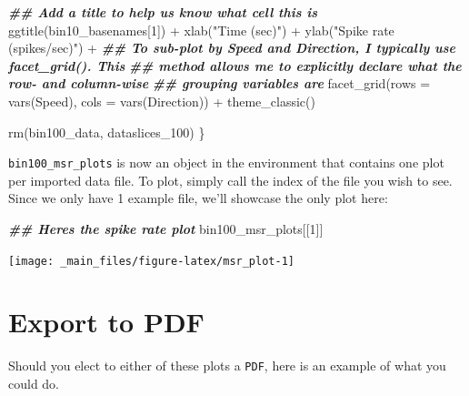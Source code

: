 \documentclass[
]{book}
\newenvironment{Shaded}{\begin{snugshade}}{\end{snugshade}}
\newcommand{\AttributeTok}[1]{\textcolor[rgb]{0.77,0.63,0.00}{#1}}
\newcommand{\DecValTok}[1]{\textcolor[rgb]{0.00,0.00,0.81}{#1}}
\newcommand{\DocumentationTok}[1]{\textcolor[rgb]{0.56,0.35,0.01}{\textbf{\textit{#1}}}}
\newcommand{\FunctionTok}[1]{\textcolor[rgb]{0.00,0.00,0.00}{#1}}
\newcommand{\NormalTok}[1]{#1}
\newcommand{\SpecialCharTok}[1]{\textcolor[rgb]{0.00,0.00,0.00}{#1}}
\newcommand{\StringTok}[1]{\textcolor[rgb]{0.31,0.60,0.02}{#1}}
\begin{document}
\begin{Shaded}
\begin{Highlighting}[]
    \DocumentationTok{\#\# Add a title to help us know what cell this is}
    \FunctionTok{ggtitle}\NormalTok{(bin10\_basenames[}\DecValTok{1}\NormalTok{]) }\SpecialCharTok{+}
    \FunctionTok{xlab}\NormalTok{(}\StringTok{"Time (sec)"}\NormalTok{) }\SpecialCharTok{+}
    \FunctionTok{ylab}\NormalTok{(}\StringTok{"Spike rate (spikes/sec)"}\NormalTok{) }\SpecialCharTok{+}
    \DocumentationTok{\#\# To sub{-}plot by Speed and Direction, I typically use \textasciigrave{}facet\_grid()\textasciigrave{}. This}
    \DocumentationTok{\#\# method allows me to explicitly declare what the row{-} and column{-}wise}
    \DocumentationTok{\#\# grouping variables are}
    \FunctionTok{facet\_grid}\NormalTok{(}\AttributeTok{rows =} \FunctionTok{vars}\NormalTok{(Speed), }\AttributeTok{cols =} \FunctionTok{vars}\NormalTok{(Direction)) }\SpecialCharTok{+}
    \FunctionTok{theme\_classic}\NormalTok{()}

  \FunctionTok{rm}\NormalTok{(bin100\_data, dataslices\_100)}
\NormalTok{\}}
\end{Highlighting}
\end{Shaded}

\texttt{bin100\_msr\_plots} is now an object in the environment that contains one plot
per imported data file. To plot, simply call the index of the file you
wish to see. Since we only have 1 example file, we'll showcase the only
plot here:

\begin{Shaded}
\begin{Highlighting}[]
\DocumentationTok{\#\# Here\textquotesingle{}s the spike rate plot}
\NormalTok{bin100\_msr\_plots[[}\DecValTok{1}\NormalTok{]]}
\end{Highlighting}
\end{Shaded}

\texttt{[image: \_main\_files/figure-latex/msr\_plot-1]}

\hypertarget{export-to-pdf}{%
\section{Export to PDF}\label{export-to-pdf}}

Should you elect to either of these plots a \texttt{PDF}, here is an example
of what you could do.
\end{document}
